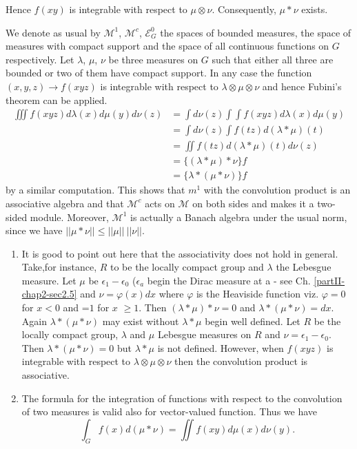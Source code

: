  
Hence $f(xy)$ is integrable with respect to $\mu \otimes
\nu$. Consequently, $\mu * \nu$ exists. 

 We denote as usual by $\mathscr{M}^1$, $\mathscr{M}^c$,
 $\mathscr{E}^{0}_{G}$ the spaces of bounded 
 measures, the space of measures with compact support and the space of
 all continuous functions on $G$ respectively. Let $\lambda$, $\mu$,
 $\nu$ be three measures on $G$ such that either all three are bounded
 or two of them have compact support. In any case the function  
$(x, y, z) \rightarrow f(xyz)$ is integrable with respect to
 $\lambda \otimes \mu \otimes \nu$ and hence Fubini's theorem can be
 applied. 
\begin{align*} 
\iiint f(xyz) d\lambda (x) d \mu (y) d \nu (z) &= \int d \nu (z)
\int\int f(xyz) d  
\lambda (x) d \mu (y)\\ 
& = \int d \nu (z) \int f (tz) d (\lambda * \mu)(t)\\
& = \iint f(tz) d(\lambda * \mu) (t) d \nu (z)\\
& = \{(\lambda * \mu ) * \nu\} f\\
& = \{\lambda * (\mu * \nu)\} f
\end{align*}
by a similar computation. This shows that $m^1$ with the convolution
product is an associative algebra and that $\mathscr{M}^c$ acts on
$\mathscr{M}$ on both sides and\pageoriginale 
makes it a two-sided module. Moreover, $\mathscr{M}^1$ is actually a
Banach algebra under the usual norm, since we have $|| \mu * \nu ||
\leq || \mu ||~ || \nu ||$. 

\begin{remarks*}
\begin{enumerate}
\renewcommand{\labelenumi}{(\theenumi)}
\item It is good to point out here that the associativity does not
  hold in general. Take,for instance, $R$ to be the locally compact
  group and $\lambda$ the Lebesgue measure. Let $\mu$ be $\epsilon_1 -
  \epsilon_0$ ($\epsilon_a$ begin the Dirac measure at a - see
  Ch. \ref{partII-chap2-sec2.5}   
  and $\nu =
  \varphi(x) dx$ where $\varphi$ is the Heaviside function
  viz. $\varphi=0$ for $x<0$ and =$1$ for $x$ $\geq 1$. Then
  $(\lambda*\mu)*\nu=0$ and $\lambda*(\mu*\nu)=dx$. Again
  $\lambda*(\mu*\nu)$ may exist without $\lambda*\mu$ begin well
  defined. Let $R$ be the locally compact group, 
$\lambda$ and $\mu$ Lebesgue measures on $R$ and $\nu =
  \epsilon_1-\epsilon_0$. Then $\lambda*(\mu*\nu)=0$ but $\lambda*\mu$
  is not defined. However, when $f(xyz)$ is integrable with respect to
  $ \lambda \otimes \mu \otimes\nu$ then the convolution product is
  associative.  

\item The formula for the integration of functions with respect to the
  convolution of two measures is valid also for vector-valued 
function.
Thus we have 
$$
\int_G f(x) d(\mu*\nu) = \iint f(xy) d \mu(x) d \nu(y). 
 $$
\end{enumerate}
\end{remarks*}

